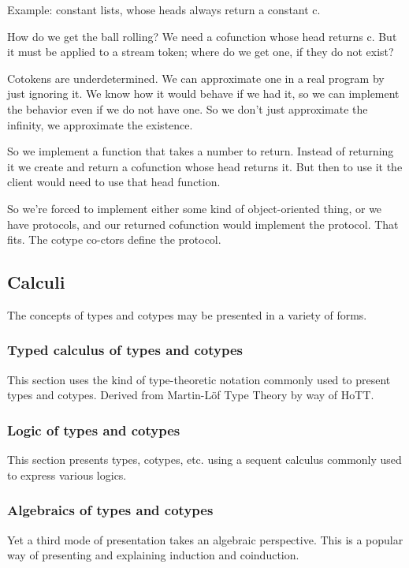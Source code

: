 Example: constant lists, whose heads always return a constant c.

How do we get the ball rolling? We need a cofunction whose head
returns c. But it must be applied to a stream token; where do we get
one, if they do not exist?

Cotokens are underdetermined. We can approximate one in a real program
by just ignoring it. We know how it would behave if we had it, so we
can implement the behavior even if we do not have one.  So we don't just approximate the infinity, we approximate the existence.

So we implement a  function that takes a number to
return. Instead of returning it we create and return a cofunction
whose head returns it. But then to use it the client would need to use
that head function.

So we're forced to implement either some kind of object-oriented
thing, or we have protocols, and our returned cofunction would
implement the protocol. That fits. The cotype co-ctors define the
protocol.


\subsection{Calculi}
The concepts of types and cotypes may be presented in a variety of forms.

\subsubsection{Typed calculus of types and cotypes}

This section uses the kind of type-theoretic notation commonly used to
present types and cotypes. Derived from Martin-Löf Type Theory by way
of HoTT.

\subsubsection{Logic of types and cotypes}

This section presents types, cotypes, etc. using a sequent calculus
commonly used to express various logics.

\subsubsection{Algebraics of types and cotypes}

Yet a third mode of presentation takes an algebraic perspective. This
is a popular way of presenting and explaining induction and
coinduction.

